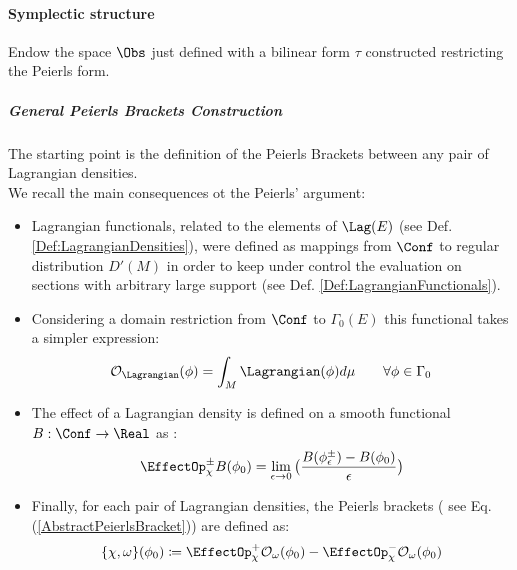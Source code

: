 \documentclass[Main]{subfiles}
\begin{document}
		\paragraph{Symplectic structure}
			Endow the space $\Obs$ just defined with a bilinear form $\tau$ constructed restricting the Peierls form.
			\subparagraph{General Peierls Brackets Construction}
			The starting point is the definition of the Peierls Brackets between any pair of Lagrangian densities.
			\\
				We recall the main consequences  ot the Peierls' argument:
				\begin{itemize}
					\item Lagrangian functionals, related to the elements of $\Lag(E)$ (see Def. \ref{Def:LagrangianDensities}),
					were defined as mappings from $\Conf$ to regular distribution $D'(M)$ in order to keep under control the evaluation on sections with arbitrary large support (see Def. \ref{Def:LagrangianFunctionals}).

					\item Considering a domain restriction from $\Conf$ to $\Gamma_0(E)$  this functional takes a simpler expression:
					\begin{displaymath}
						\mathcal{O}_\Lagrangian( \phi) = \int_M \Lagrangian(\phi) d\mu \qquad \forall \phi \in \Gamma_0
					\end{displaymath}
					\item The effect of  a Lagrangian density  is defined on a smooth functional $B: \Conf \rightarrow \Real$ as :
						\begin{displaymath}
							\EffectOp_\chi^\pm B (\phi_0) = \lim_{\epsilon\rightarrow 0} \big( \frac{B(\phi_\epsilon^\pm) - B (\phi_0)} {\epsilon} \big)
						\end{displaymath}
					\item Finally, for each pair of Lagrangian densities, the Peierls brackets ( see Eq. (\ref{AbstractPeierlsBracket})) are defined as:
						\begin{displaymath}
							\{\chi, \omega \}(\phi_0) \coloneqq \EffectOp_\chi^+ \mathcal{O}_\omega (\phi_0) - \EffectOp_\chi^- \mathcal{O}_\omega(\phi_0)
						\end{displaymath}
				\end{itemize}
\end{document}
